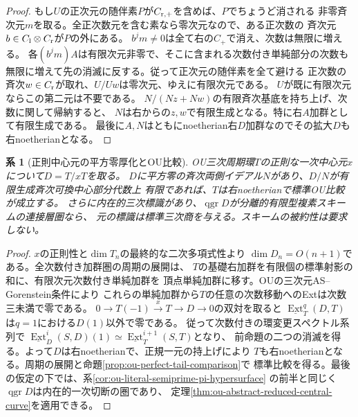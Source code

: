 \documentclass[11pt,a4paper]{ltjsarticle}
\newtheorem{corollary}[theorem]{系}
\theoremstyle{definition}
\newcommand{\qgr}{\operatorname{qgr}}
\begin{document}
\begin{proof}
もし$U$の正次元の随伴素$P$が$C_{{\rm r},+}$を含めば、$P$でちょうど消される
非零斉次元$m$を取る。全正次数元を含む素なら零次元なので、ある正次数の
斉次元$b\in C_{\rm l}\otimes C_{\rm r}$が$P$の外にある。
$b^jm\ne0$は全て右の$C_+$で消え、次数は無限に増える。
各$(b^jm)A$は有限次元非零で、そこに含まれる次数付き単純部分の次数も
無限に増えて先の消滅に反する。従って正次元の随伴素を全て避ける
正次数の斉次$w\in C_{\rm r}$が取れ、$U/Uw$は零次元、ゆえに有限次元である。
$U$が既に有限次元ならこの第二元は不要である。
$N/(Nz+Nw)$の有限斉次基底を持ち上げ、次数に関して帰納すると、
$N$は右からの$z,w$で有限生成となる。特に右$A$加群として有限生成である。
最後に$A,N$はともにnoetherian右$D$加群なのでその拡大$D$も右noetherianとなる。
\end{proof}

\begin{corollary}[正則中心元の平方零厚化とOU比較]
\label{cor:ou-square-zero-small-comparison}
OU三次周期環$T$の正則な一次中心元$x$について$D=T/xT$を取る。
$D$に平方零の斉次両側イデアル$N$があり、$D/N$が有限生成斉次可換中心部分代数上
有限であれば、$T$は右noetherianで標準OU比較が成立する。
さらに内在的三次標識があり、$\qgr D$が分離的有限型複素スキームの連接層圏なら、
元の標識は標準三次商を与える。スキームの被約性は要求しない。
\end{corollary}
\begin{proof}
$x$の正則性と$\dim T_n$の最終的な二次多項式性より
$\dim D_n=O(n+1)$である。全次数付き加群圏の周期の展開は、
$T$の基礎右加群を有限個の標準射影の和に、有限次元次数付き単純加群を
頂点単純加群に移す。OUの三次元AS--Gorenstein条件\cite[(2.1)]{OU}により
これらの単純加群から$T$の任意の次数移動へのExtは次数三未満で零である。
$0\to T(-1)\xrightarrow{x}T\to D\to0$の双対を取ると
$\underline{\operatorname{Ext}}^q_T(D,T)$は$q=1$における$D(1)$以外で零である。
従って次数付きの環変更スペクトル系列で
$\underline{\operatorname{Ext}}^i_D(S,D)(1)
\simeq\underline{\operatorname{Ext}}^{i+1}_T(S,T)$となり、
前命題の二つの消滅を得る。よって$D$は右noetherianで、正規一元の持上げにより
$T$も右noetherianとなる。周期の展開と命題\ref{prop:ou-perfect-tail-comparison}で
標準比較を得る。最後の仮定の下では、系\ref{cor:ou-literal-semiprime-pi-hypersurface}
の前半と同じく$\qgr D$は内在的一次切断の圏であり、
定理\ref{thm:ou-abstract-reduced-central-curve}を適用できる。
\end{proof}
\end{document}
